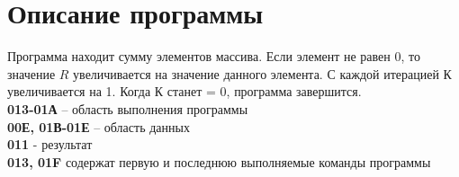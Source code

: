 \documentclass[a4paper,14pt]{article}
\begin{document}
\section{Описание программы}
Программа находит сумму элементов массива. Если элемент не равен 0, то значение $R$ увеличивается на значение данного элемента. С каждой итерацией $К$ увеличивается на 1. Когда К станет = 0, программа завершится.\\

\noindent
\textbf{013-01А} – область выполнения программы\\
\textbf{00Е, 01В-01Е} – область данных\\
\textbf{011} - результат\\
\textbf{013, 01F} содержат первую и последнюю выполняемые команды программы
\end{document}
